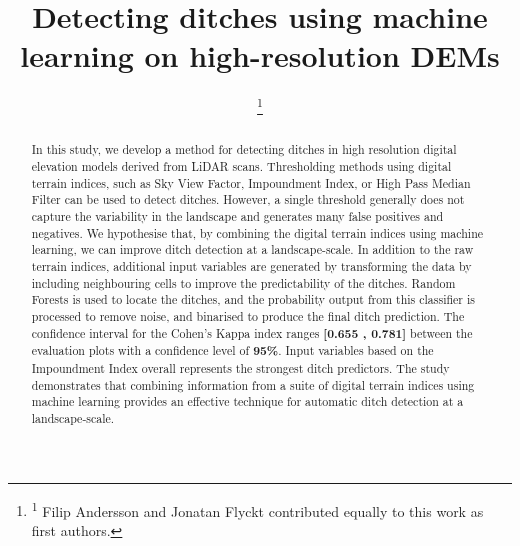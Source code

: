 \documentclass[]{interact}
\theoremstyle{plain}%
\theoremstyle{definition}
\theoremstyle{remark}
\begin{document}
\title{Detecting ditches using machine learning on high-resolution DEMs}

\author{
 
\footnote{\textsuperscript{1} Filip Andersson and Jonatan Flyckt contributed equally to this work as first authors.}}

\maketitle

\begin{abstract}
In this study, we develop a method for detecting ditches in high resolution digital elevation models derived from LiDAR scans. Thresholding methods using digital terrain indices, such as Sky View Factor, Impoundment Index, or High Pass Median Filter can be used to detect ditches. However, a single threshold generally does not capture the variability in the landscape and generates many false positives and negatives. We hypothesise that, by combining the digital terrain indices using machine learning, we can improve ditch detection at a landscape-scale. In addition to the raw terrain indices, additional input variables are generated by transforming the data by including neighbouring cells to improve the predictability of the ditches. Random Forests is used to locate the ditches, and the probability output from this classifier is processed to remove noise, and binarised to produce the final ditch prediction. The confidence interval for the Cohen's Kappa index ranges \textbf{[0.655 , 0.781]} between the evaluation plots with a confidence level of \textbf{95\%}. Input variables based on the Impoundment Index overall represents the strongest ditch predictors. The study demonstrates that combining information from  a suite of digital terrain indices using machine learning provides an effective technique for automatic ditch detection at a landscape-scale.
\end{abstract}
\end{document}

